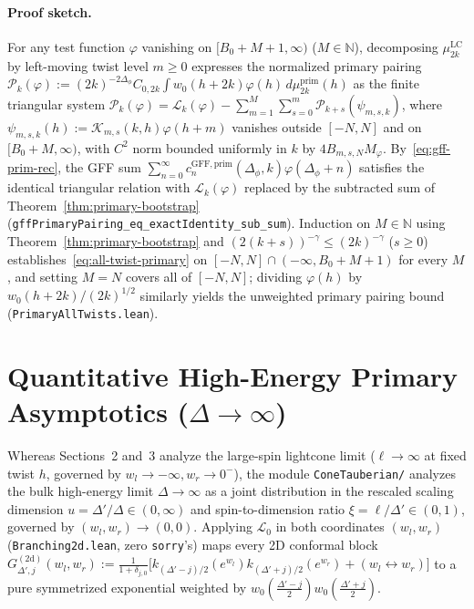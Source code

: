 \documentclass[10pt,a4paper]{article}
\theoremstyle{definition}
\begin{document}
\paragraph{Proof sketch.}
For any test function $\varphi$ vanishing on $[B_0 + M + 1, \infty)$ ($M \in \mathbb{N}$), decomposing $\mu^{\mathrm{LC}}_{2k}$ by left-moving twist level $m \ge 0$ expresses the normalized primary pairing $\mathcal{P}_k(\varphi) := (2k)^{-2\Delta_\phi} C_{0, 2k} \int w_0(h + 2k) \varphi(h) \, d\mu^{\mathrm{prim}}_{2k}(h)$ as the finite triangular system $\mathcal{P}_k(\varphi) = \mathcal{L}_k(\varphi) - \sum_{m=1}^{M} \sum_{s=0}^{m} \mathcal{P}_{k + s}(\psi_{m, s, k})$, where $\psi_{m, s, k}(h) := \mathcal{K}_{m, s}(k, h)\varphi(h + m)$ vanishes outside $[-N, N]$ and on $[B_0 + M, \infty)$, with $C^2$ norm bounded uniformly in $k$ by $4 B_{m, s, N} M_\varphi$. By~\eqref{eq:gff-prim-rec}, the GFF sum $\sum_{n=0}^\infty c^{\mathrm{GFF, prim}}_n(\Delta_\phi, k)\varphi(\Delta_\phi + n)$ satisfies the identical triangular relation with $\mathcal{L}_k(\varphi)$ replaced by the subtracted sum of Theorem~\ref{thm:primary-bootstrap} (\texttt{gffPrimaryPairing\_eq\_exactIdentity\_sub\_sum}). Induction on $M \in \mathbb{N}$ using Theorem~\ref{thm:primary-bootstrap} and $(2(k + s))^{-\gamma} \le (2k)^{-\gamma}$ ($s \ge 0$) establishes~\eqref{eq:all-twist-primary} on $[-N, N] \cap (-\infty, B_0 + M + 1)$ for every $M$, and setting $M = N$ covers all of $[-N, N]$; dividing $\varphi(h)$ by $w_0(h + 2k)/(2k)^{1/2}$ similarly yields the unweighted primary pairing bound (\texttt{PrimaryAllTwists.lean}).

\section{Quantitative High-Energy Primary Asymptotics (\texorpdfstring{$\Delta \to \infty$}{Delta -> infty})}

Whereas Sections~2 and~3 analyze the large-spin lightcone limit ($\ell \to \infty$ at fixed twist $h$, governed by $w_l \to -\infty, w_r \to 0^-$), the module \texttt{ConeTauberian/} analyzes the bulk high-energy limit $\Delta \to \infty$ as a joint distribution in the rescaled scaling dimension $u = \Delta'/\Delta \in (0, \infty)$ and spin-to-dimension ratio $\xi = \ell/\Delta' \in (0, 1)$, governed by $(w_l, w_r) \to (0, 0)$. Applying $\mathcal{L}_0$ in both coordinates $(w_l, w_r)$ (\texttt{Branching2d.lean}, zero \texttt{sorry}'s) maps every 2D conformal block $G^{(2\mathrm{d})}_{\Delta', j}(w_l, w_r) := \frac{1}{1 + \delta_{j, 0}}\bigl[k_{(\Delta'-j)/2}(e^{w_l}) k_{(\Delta'+j)/2}(e^{w_r}) + (w_l \leftrightarrow w_r)\bigr]$ to a pure symmetrized exponential weighted by $w_0(\frac{\Delta'-j}{2}) w_0(\frac{\Delta'+j}{2})$.
\end{document}
